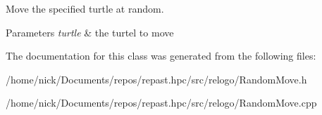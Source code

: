 Move the specified turtle at random. 


\begin{DoxyParams}{Parameters}
{\em turtle} & the turtel to move \\
\hline
\end{DoxyParams}


The documentation for this class was generated from the following files\-:\begin{DoxyCompactItemize}
\item 
/home/nick/\-Documents/repos/repast.\-hpc/src/relogo/Random\-Move.\-h\item 
/home/nick/\-Documents/repos/repast.\-hpc/src/relogo/Random\-Move.\-cpp\end{DoxyCompactItemize}
